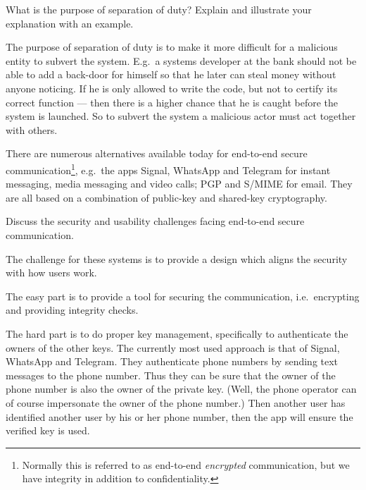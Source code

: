 \question[3]
What is the purpose of separation of duty?
Explain and illustrate your explanation with an example.

\begin{solution}
  The purpose of separation of duty is to make it more difficult for 
  a malicious entity to subvert the system.
  E.g.\ a systems developer at the bank should not be able to add a back-door 
  for himself so that he later can steal money without anyone noticing.
  If he is only allowed to write the code, but not to certify its correct 
  function --- then there is a higher chance that he is caught before the 
  system is launched.
  So to subvert the system a malicious actor must act together with others.
\end{solution}


\question[3]
  There are numerous alternatives available today for end-to-end secure 
  communication\footnote{%
    Normally this is referred to as end-to-end \emph{encrypted} communication, 
    but we have integrity in addition to confidentiality.
  }, e.g.\ the apps Signal, WhatsApp and Telegram for instant messaging, media 
  messaging and video calls; PGP and S/MIME for email.
  They are all based on a combination of public-key and shared-key cryptography.

  Discuss the security and usability challenges facing end-to-end secure 
  communication.

  \begin{solution}
    The challenge for these systems is to provide a design which aligns the 
    security with how users work.

    The easy part is to provide a tool for securing the communication, i.e.\ 
    encrypting and providing integrity checks.

    The hard part is to do proper key management, specifically to authenticate 
    the owners of the other keys.
    The currently most used approach is that of Signal, WhatsApp and Telegram.
    They authenticate phone numbers by sending text messages to the phone 
    number.
    Thus they can be sure that the owner of the phone number is also the owner 
    of the private key.
    (Well, the phone operator can of course impersonate the owner of the phone 
    number.)
    Then another user has identified another user by his or her phone number, 
    then the app will ensure the verified key is used.
  \end{solution}


